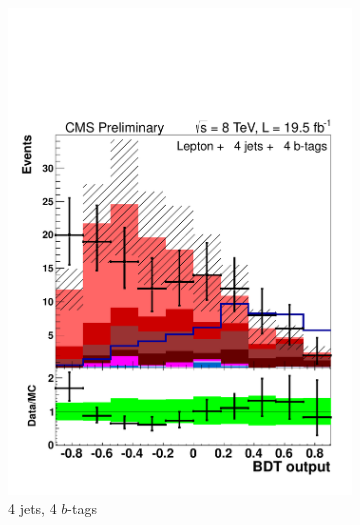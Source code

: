 \begin{figure}[hbtp]
\begin{subfigure}[hbtp]{0.31\textwidth}
     \includegraphics[width=\textwidth]{Figures/Analysis_2_Diagrams/LJ_plots_lep/4j4t/lep_disc_final10v16_8TeV_CFMlpANN_BDT_4j4t_cumulative_wRatio_noLegend_lin.pdf}
     \caption{4 jets, 4 $b$-tags}\label{lj_BDToutput_8TeV_2}
   \end{subfigure}
   ~ %
   \begin{subfigure}[hbtp]{0.31\textwidth}

\end{subfigure}
\end{figure}
